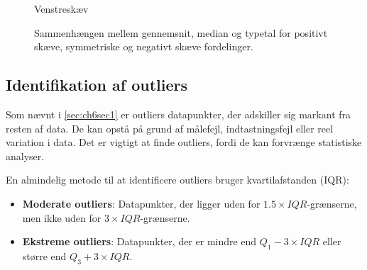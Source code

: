 \begin{figure}[htbp]
\begin{minipage}{0.32\textwidth}
    \end{minipage}
    \hfill
    \begin{minipage}{0.32\textwidth}
        \centering
        \par\small Venstreskæv
    \end{minipage}
    \caption{Sammenhængen mellem gennemsnit, median og typetal for positivt skæve, symmetriske og negativt skæve fordelinger.}
    \label{fig:skew_mean_median_mode}
\end{figure}

\subsection*{Identifikation af outliers}

Som nævnt i \autoref{sec:ch6sec1} er outliers datapunkter, der adskiller sig markant fra resten af data. De kan opstå på grund af målefejl, indtastningsfejl eller reel variation i data. Det er vigtigt at finde outliers, fordi de kan forvrænge statistiske analyser.

En almindelig metode til at identificere outliers bruger kvartilafstanden (IQR):

\begin{itemize}
    \item \textbf{Moderate outliers}: Datapunkter, der ligger uden for $1.5\times IQR$-grænserne, men ikke uden for $3\times IQR$-grænserne.
    \item \textbf{Ekstreme outliers}: Datapunkter, der er mindre end $Q_1 - 3 \times IQR$ eller større end $Q_3 + 3 \times IQR$.
\end{itemize}


